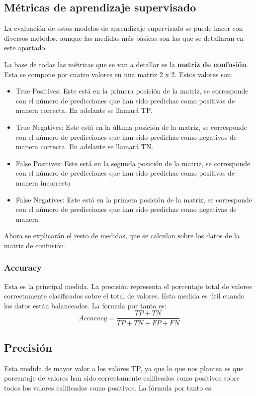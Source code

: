 \subsection{Métricas de aprendizaje supervisado}
La evaluación de estos modelos de aprendizaje supervisado se puede hacer con diversos métodos, aunque las medidas más básicas son las que se detallaran en este apartado.

La base de todas las métricas\cite{themachinelearnersMtricasClasificacin} que se van a detallar es la \textbf{matriz de confusión}. Esta se compone por cuatro valores en una matriz 2 x 2.
Estos valores son:
\begin{itemize}
	\item True Positives: Este está en la primera posición de la matriz, se corresponde con el número de predicciones que han sido predichas como positivas de manera correcta. En adelante se llamará TP. 
	
	\item True Negatives: Este está en la última posición de la matriz, se corresponde con el número de predicciones que han sido predichas como negativos de manera correcta. En adelante se llamará TN. 
	
	\item False Positives: Este está en la segunda posición de la matriz, se corresponde con el número de predicciones que han sido predichas como positivas de manera incorrecta
	
	\item False Negatives: Este está en la primera posición de la matriz, se corresponde con el número de predicciones que han sido predichas como negativas de manera 
	
\end{itemize}

Ahora se explicarán el resto de medidas, que se calculan sobre los datos de la matriz de confusión.

\subsubsection{Accuracy}
Esta es la principal medida. La precisión representa el porcentaje total de valores correctamente clasificados sobre el total de valores. Esta medida es útil cuando los datos están balanceados. La formula por tanto es:
\begin{equation}
	Accuracy=\frac{TP+TN}{TP+TN+FP+FN}
\end{equation}
 
\subsection{Precisión}
Esta medida de mayor valor a los valores TP, ya que lo que nos plantea es que porcentaje de valores han sido correctamente calificados como positivos sobre todos los valores calificados como positivos. La fórmula por tanto es:

